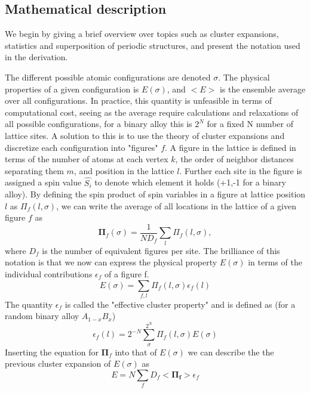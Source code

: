 \subsection{Mathematical description}
We begin by giving a brief overview over topics such as cluster expansions, statistics and superposition of periodic structures, and present the notation used in the derivation.  

The different possible atomic configurations are denoted $\sigma$. The physical properties of a given configuration is $E(\sigma)$, and $<E>$ is the ensemble average over all configurations. In practice, this quantity is unfeasible in terms of computational cost, seeing as the average require calculations and relaxations of all possible configurations, for a binary alloy this is $2^N$ for a fixed N number of lattice sites. A solution to this is to use the theory of cluster expansions and discretize each configuration into "figures" $f$. A figure in the lattice is defined in terms of the number of atoms at each vertex $k$, the order of neighbor distances separating them $m$, and position in the lattice $l$. Further each site in the figure is assigned a spin value $\hat{S_i}$ to denote which element it holds (+1,-1 for a binary alloy). By defining the spin product of spin variables in a figure at lattice position $l$ as $\Pi_f(l, \sigma)$, we can write the average of all locations in the lattice of a given figure $f$ as
\begin{equation}
    \boldsymbol{\Pi}_f(\sigma) = \frac{1}{ND_f} \sum_l \Pi_f (l,\sigma),
\end{equation}
where $D_f$ is the number of equivalent figures per site. The brilliance of this notation is that we now can express the physical property $E(\sigma)$ in terms of the individual contributions $\epsilon_f$ of a figure f.
\begin{equation}
    E(\sigma) = \sum_{f,l} \Pi_f(l, \sigma) \epsilon_f(l)
\end{equation}
The quantity $\epsilon_f$ is called the "effective cluster property" and is defined as (for a random binary alloy $A_{1-x}B_x$)
\begin{equation}
    \epsilon_f(l) = 2^{-N}\sum_\sigma^{2^N} \Pi_f (l,\sigma) E(\sigma)
\end{equation}
Inserting the equation for $\boldsymbol{\Pi}_f$ into that of $E(\sigma)$ we can describe the the previous cluster expansion of $E(\sigma)$ as
\begin{equation}
    E = N\sum_f D_f<\boldsymbol{\Pi_f}>\epsilon_f
\end{equation}
